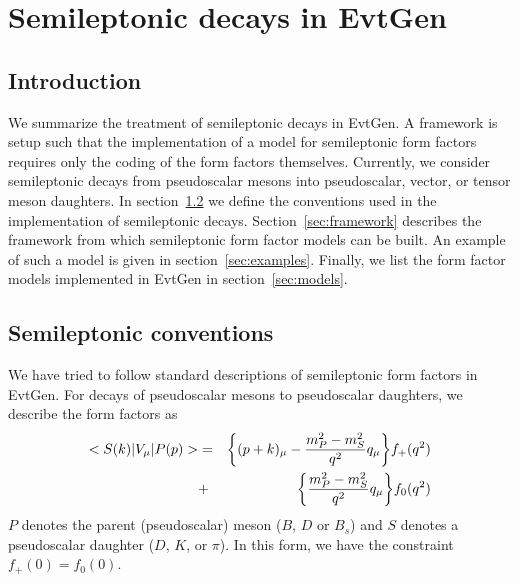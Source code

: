 \section{Semileptonic decays in EvtGen}
\label{semileptonic}

\label{Semileptonic decays}
\subsection{Introduction}
We summarize the treatment of semileptonic decays in
EvtGen.  A framework is setup such that the implementation of
a model for semileptonic form factors requires only the 
coding of the form factors themselves.  Currently, we consider
semileptonic decays from pseudoscalar mesons into 
pseudoscalar, vector, or tensor meson daughters.
In section~\ref{sec:conventions} we define the
conventions used in the implementation of semileptonic
decays.  Section~\ref{sec:framework} describes the framework
from which semileptonic form factor models can be built.  An
example of such a model is given in section~\ref{sec:examples}.
Finally, we list the form factor models implemented in EvtGen
in section~\ref{sec:models}.

\subsection{Semileptonic conventions}
\label{sec:conventions}
We have tried to follow standard descriptions of semileptonic
form factors in EvtGen.  
For decays of 
pseudoscalar mesons to pseudoscalar daughters, we describe the
form factors as
\begin{eqnarray}
<S(k) \vert V_{\mu} \vert P(p) > & = &\biggl \{ (p+k)_{\mu} - 
{{m_P^2 - m_S^2} \over {q^2}} q_{\mu} \biggr \} f_+(q^2) \\
&+& 
\biggl \{  {{m_P^2 - m_S^2} \over {q^2}} q_{\mu} \biggr \} f_0(q^2) 
\nonumber
\end{eqnarray}
$P$ denotes the parent (pseudoscalar) meson ($B$, $D$ or $B_s$) and 
$S$ denotes a pseudoscalar daughter ($D$, $K$, or $\pi$).  In this
form, we have the constraint $f_+(0) = f_0(0)$. \\

